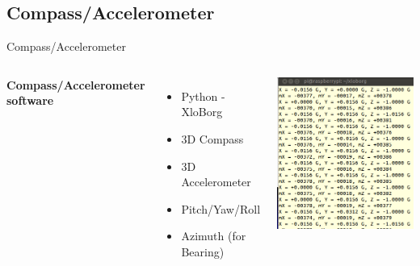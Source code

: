 \documentclass[aspectratio=169,unknownkeysallowed,xcolor=dvipsnames,beamer]{beamer} %
\begin{document}
{
\begin{frame}[plain]
\end{frame}}

\subsection{Compass/Accelerometer}
\begin{frame}[fragile]{Compass/Accelerometer}
\begin{columns}
\textbf{Compass/Accelerometer software}
\vspace{5mm}
\begin{itemize}
 \item Python - XloBorg 
 \item 3D Compass
 \item 3D Accelerometer
 \item Pitch/Yaw/Roll
 \item Azimuth (for Bearing)
 \end{itemize}
\begin{center}
 \includegraphics[width=7cm]{accelerometer_data}
\end{center}
\end{columns}
\end{frame}
\end{document}

